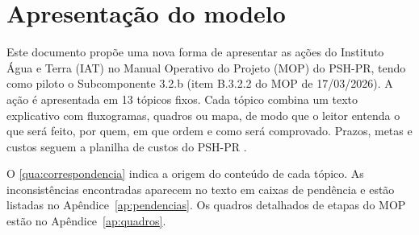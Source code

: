 \tableofcontents*
\cleardoublepage

\textual

\chapter*[Apresentação do modelo]{Apresentação do modelo}

Este documento propõe uma nova forma de apresentar as ações do Instituto Água
e Terra (IAT) no Manual Operativo do Projeto (MOP) do PSH-PR, tendo como
piloto o Subcomponente 3.2.b (item B.3.2.2 do MOP de 17/03/2026). A ação é
apresentada em 13 tópicos fixos. Cada tópico combina um texto explicativo com
fluxogramas, quadros ou mapa, de modo que o leitor entenda o que será feito,
por quem, em que ordem e como será comprovado. Prazos, metas e custos seguem a
planilha de custos do PSH-PR \cite{custo2026}.

O \autoref{qua:correspondencia} indica a origem do conteúdo de cada tópico. As
inconsistências encontradas aparecem no texto em caixas de pendência e estão
listadas no Apêndice~\ref{ap:pendencias}. Os quadros detalhados de etapas do
MOP estão no Apêndice~\ref{ap:quadros}.

